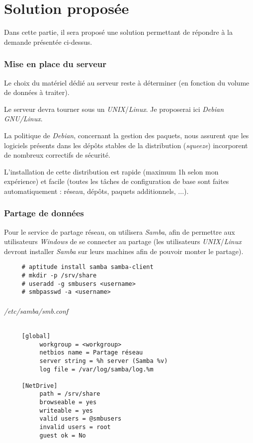 \part{Solution proposée}

Dans cette partie, il sera proposé une solution permettant de répondre à la demande
présentée ci-dessus.

\section{Mise en place du serveur}

Le choix du matériel dédié au serveur reste à déterminer (en fonction du volume de données à
traiter). \newline

Le serveur devra tourner sous un \textit{UNIX}/\textit{Linux}. Je proposerai ici
\textit{Debian GNU/Linux}.

La politique de \textit{Debian}, concernant la gestion des paquets, nous assurent que les
logiciels présents dans les dépôts stables de la distribution (\textit{squeeze}) incorporent
de nombreux correctifs de sécurité.

L'installation de cette distribution est rapide (maximum 1h selon mon expérience) et facile
(toutes les tâches de configuration de base sont faites automatiquement : réseau, dépôts, paquets
additionnels, ...).

\section{Partage de données}

Pour le service de partage réseau, on utilisera \textit{Samba}, afin de permettre aux utilisateurs
\textit{Windows} de se connecter au partage (les utilisateurs \textit{UNIX}/\textit{Linux} devront
installer \textit{Samba} sur leurs machines afin de pouvoir monter le partage). \newline

\begin{verbatim}
     # aptitude install samba samba-client
     # mkdir -p /srv/share
     # useradd -g smbusers <username>
     # smbpasswd -a <username>
\end{verbatim}

\paragraph{/etc/samba/smb.conf}
\begin{verbatim}
     [global]
          workgroup = <workgroup>
          netbios name = Partage réseau
          server string = %h server (Samba %v)
          log file = /var/log/samba/log.%m

     [NetDrive]
          path = /srv/share
          browseable = yes
          writeable = yes
          valid users = @smbusers
          invalid users = root
          guest ok = No
\end{verbatim}

